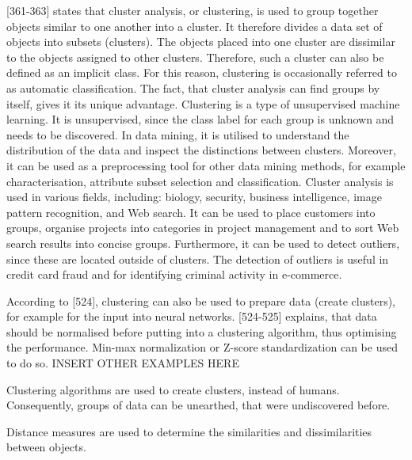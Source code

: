 \textcite{han2011data}[361-363] states that cluster analysis, or clustering, is used to group together objects similar to one another into a cluster. It therefore divides a data set of objects into subsets (clusters). The objects placed into one cluster are dissimilar to the objects assigned to other clusters. Therefore, such a cluster can also be defined as an implicit class. For this reason, clustering is occasionally referred to as automatic classification. The fact, that cluster analysis can find groups by itself, gives it its unique advantage. Clustering is a type of unsupervised machine learning. It is unsupervised, since the class label for each group is unknown and needs to be discovered. In data mining, it is utilised to understand the distribution of the data and inspect the distinctions between clusters. Moreover, it can be used as a preprocessing tool for other data mining methods, for example characterisation, attribute subset selection and classification.
Cluster analysis is used in various fields, including: biology, security, business intelligence, image pattern recognition, and Web search. It can be used to place customers into groups, organise projects into categories in project management and to sort Web search results into concise groups. Furthermore, it can be used to detect outliers, since these are located outside of clusters. The detection of outliers is useful in credit card fraud and for identifying criminal activity in e-commerce. 

According to \textcite{DataMiningAndPredictiveAnalytics}[524], clustering can also be used to prepare data (create clusters), for example for the input into neural networks.
\textcite{DataMiningAndPredictiveAnalytics}[524-525] explains, that data should be normalised before putting into a clustering algorithm, thus optimising the performance. Min-max normalization or Z-score standardization can be used to do so.
INSERT OTHER EXAMPLES HERE








Clustering algorithms are used to create clusters, instead of humans. Consequently, groups of data can be unearthed, that were undiscovered before.

Distance measures are used to determine the similarities and dissimilarities between objects. 



